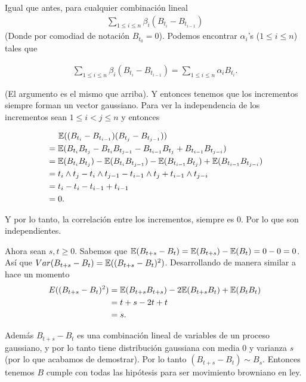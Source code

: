 Igual que antes, para cualquier combinación lineal
\begin{align}
    \sum_{1 \leq i \leq n}  \beta_i (B_{t_i} - B_{t_{i-1}})    
\end{align}
(Donde por comodiad de notación $B_{t_0} = 0$). Podemos encontrar $\alpha_i$'s ($1 \leq i \leq n$) tales que

\begin{align}
    \sum_{1 \leq i \leq n}  \beta_i (B_{t_i} - B_{t_{i-1}}) = \sum_{1 \leq i \leq n}  \alpha_i B_{t_i}.
\end{align}\pn

(El argumento es el mismo que arriba). Y entonces tenemos que los incrementos siempre forman un vector gaussiano. 
Para ver la independencia de los incrementos sean $1 \leq i < j \leq n$ y entonces

\begin{align}
        &   \;\;\;\;\;\mathbb{E}((B_{t_i} - B_{t_{i-1}})(B_{t_j} - B_{t_{j-1}}))                                                \\
        &=  \mathbb{E}(B_{t_{i}}B_{t_{j}} - B_{t_{i}}B_{t_{j-1}} - B_{t_{i-1}}B_{t_{j}} + B_{t_{i-1}}B_{t_{j-i}})               \\
        &=  \mathbb{E}(B_{t_{i}}B_{t_{j}}) - \mathbb{E}(B_{t_{i}}B_{t_{j-1}}) - \mathbb{E}(B_{t_{i-1}}B_{t_{j}}) + \mathbb{E}(B_{t_{i-1}}B_{t_{j-i}})   \\
        &=  t_{i} \wedge t_{j} - t_{i} \wedge t_{j-1} - t_{i-1} \wedge t_{j} + t_{i-1} \wedge t_{j-i}                   \\
        &=  t_{i} - t_{i} - t_{i-1} + t_{i-1}                                                                           \\
        &=  0.
\end{align}\pn

Y por lo tanto, la correlación entre los incrementos, siempre es $0$. Por lo que son independientes.\pn

Ahora sean $s,t \geq 0$. Sabemos que $\mathbb{E}(B_{t+s} - B_t) =\mathbb{E}(B_{t+s}) - \mathbb{E}(B_t) = 0 - 0 = 0$. Así que $Var(B_{t+s} - B_t) = \mathbb{E}((B_{t+s} - B_t)^2)$. 
Desarrollando de manera similar a hace un momento
\begin{align}
    E((B_{t+s} - B_t)^2)    &=  \mathbb{E}(B_{t+s}B_{t+s}) - 2\mathbb{E}(B_{t+s}B_{t}) + \mathbb{E}(B_{t}B_{t})     \\
                            &=  t+s -2t + t                                                 \\
                            &=  s.
\end{align}

Además $B_{t+s} - B_{t}$ es una combinación lineal de variables de un proceso gaussiano, y por lo tanto tiene distribución gaussiana con media $0$ 
y varianza $s$ (por lo que acabamos de demostrar). Por lo tanto $(B_{t+s} - B_t) \sim B_s$. Entonces tenemos $B$ cumple con todas las hipótesis para ser
movimiento browniano en ley.